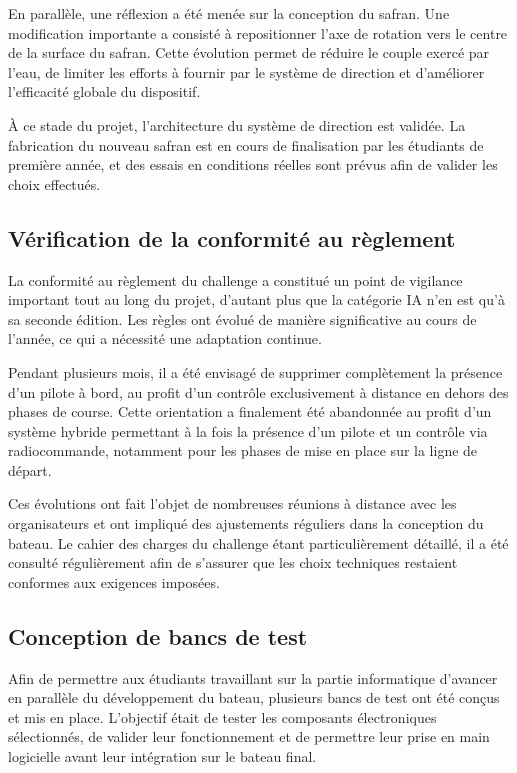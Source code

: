 \documentclass[11pt,letterpaper]{article}
\begin{document}
En parallèle, une réflexion a été menée sur la conception du safran. Une modification importante a consisté à repositionner l'axe de rotation vers le centre de la surface du safran. Cette évolution permet de réduire le couple exercé par l'eau, de limiter les efforts à fournir par le système de direction et d'améliorer l'efficacité globale du dispositif.

À ce stade du projet, l'architecture du système de direction est validée. La fabrication du nouveau safran est en cours de finalisation par les étudiants de première année, et des essais en conditions réelles sont prévus afin de valider les choix effectués.

\subsection{Vérification de la conformité au règlement}

La conformité au règlement du challenge a constitué un point de vigilance important tout au long du projet, d'autant plus que la catégorie IA n'en est qu'à sa seconde édition. Les règles ont évolué de manière significative au cours de l'année, ce qui a nécessité une adaptation continue.

Pendant plusieurs mois, il a été envisagé de supprimer complètement la présence d'un pilote à bord, au profit d'un contrôle exclusivement à distance en dehors des phases de course. Cette orientation a finalement été abandonnée au profit d'un système hybride permettant à la fois la présence d'un pilote et un contrôle via radiocommande, notamment pour les phases de mise en place sur la ligne de départ.

Ces évolutions ont fait l'objet de nombreuses réunions à distance avec les organisateurs et ont impliqué des ajustements réguliers dans la conception du bateau. Le cahier des charges du challenge étant particulièrement détaillé, il a été consulté régulièrement afin de s'assurer que les choix techniques restaient conformes aux exigences imposées.

\subsection{Conception de bancs de test}

Afin de permettre aux étudiants travaillant sur la partie informatique d'avancer en parallèle du développement du bateau, plusieurs bancs de test ont été conçus et mis en place. L'objectif était de tester les composants électroniques sélectionnés, de valider leur fonctionnement et de permettre leur prise en main logicielle avant leur intégration sur le bateau final.
\end{document}
